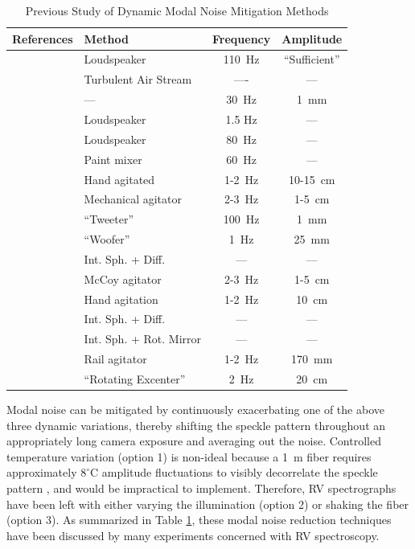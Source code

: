 \begin{table}
\centering
\caption{Previous Study of Dynamic Modal Noise Mitigation Methods}
	\begin{tabular}{llcc}
		\hline
		References & Method & Frequency & Amplitude \\
		\hline\hline
		\citet{daino_speckle_1980} & Loudspeaker & \SI{110}{\hertz} & ``Sufficient'' \\
		\hline
		\citet{hill_modal_1980} & Turbulent Air Stream & ---- & --- \\
		\hline
		\citet{baudrand_modal_2001} & --- & \SI{30}{\hertz} & \SI{1}{\milli\meter} \\
		\hline
		\multirow{2}{*}{\citet{lemke_modal_2011}} & Loudspeaker & 1.5 Hz & --- \\
		 & Loudspeaker & \SI{80}{\hertz} & --- \\
		\hline
		\multirow{3}{*}{\citet{mccoy_optical_2012}} & Paint mixer & \SI{60}{\hertz} & --- \\
		 & Hand agitated & 1-\SI{2}{\hertz} & 10-\SI{15}{\centi\meter} \\
		 & Mechanical agitator & 2-\SI{3}{\hertz} & 1-\SI{5}{\centi\meter} \\
		\hline
		\multirow{2}{*}{\citet{plavchan_precision_2013}} & ``Tweeter'' & \SI{100}{\hertz} & \SI{1}{\milli\meter} \\
		 & ``Woofer'' & \SI{1}{\hertz} & \SI{25}{\milli\meter} \\
		\hline
		\multirow{3}{*}{\citet{mahadevan_suppression_2014}} & Int. Sph. + Diff. & --- & ---\\
		 & McCoy agitator & 2-\SI{3}{\hertz} & 1-\SI{5}{\centi\meter} \\
		 & Hand agitation & 1-\SI{2}{\hertz} & \SI{10}{\centi\meter} \\
		\hline
		\multirow{2}{*}{\citet{halverson_habitable-zone_2014}} & Int. Sph. + Diff. & --- & --- \\
		 & Int. Sph. + Rot. Mirror & --- & --- \\
		\hline		
		\citet{roy_scrambling_2014} & Rail agitator & 1-\SI{2}{\hertz} & \SI{170}{\milli\meter} \\
		\hline
		\citet{sablowski_comparing_2016} & ``Rotating Excenter'' & \SI{2}{\hertz} & \SI{20}{\centi\meter} \\
		\hline
	\end{tabular}
\label{table:previous_studies}
\end{table}

Modal noise can be mitigated by continuously exacerbating one of the above three dynamic variations, thereby shifting the speckle pattern throughout an appropriately long camera exposure and averaging out the noise. Controlled temperature variation (option 1) is non-ideal because a \SI{1}{\meter} fiber requires approximately $8 ^\circ \mathrm{C}$ amplitude fluctuations to visibly decorrelate the speckle pattern \citep{redding_all-fiber_2013}, and would be impractical to implement. Therefore, RV spectrographs have been left with either varying the illumination (option 2) or shaking the fiber (option 3). As summarized in Table \ref{table:previous_studies}, these modal noise reduction techniques have been discussed by many experiments concerned with RV spectroscopy.


